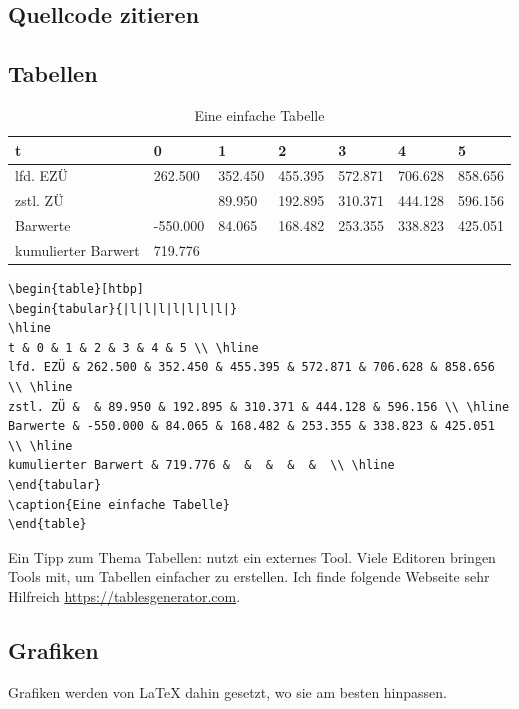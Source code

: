 \subsection{Quellcode zitieren}

\subsection{Tabellen}
\begin{table}[htbp]
\begin{tabular}{|l|l|l|l|l|l|l|}
\hline
t & 0 & 1 & 2 & 3 & 4 & 5 \\ \hline
lfd. EZÜ & 262.500 & 352.450 & 455.395 & 572.871 & 706.628 & 858.656 \\ \hline
zstl. ZÜ &  & 89.950 & 192.895 & 310.371 & 444.128 & 596.156 \\ \hline
Barwerte & -550.000 & 84.065 & 168.482 & 253.355 & 338.823 & 425.051 \\ \hline
kumulierter Barwert & 719.776 &  &  &  &  &  \\ \hline
\end{tabular}
\caption{Eine einfache Tabelle}
\end{table}

\begin{lstlisting}
\begin{table}[htbp]
\begin{tabular}{|l|l|l|l|l|l|l|}
\hline
t & 0 & 1 & 2 & 3 & 4 & 5 \\ \hline
lfd. EZÜ & 262.500 & 352.450 & 455.395 & 572.871 & 706.628 & 858.656 \\ \hline
zstl. ZÜ &  & 89.950 & 192.895 & 310.371 & 444.128 & 596.156 \\ \hline
Barwerte & -550.000 & 84.065 & 168.482 & 253.355 & 338.823 & 425.051 \\ \hline
kumulierter Barwert & 719.776 &  &  &  &  &  \\ \hline
\end{tabular}
\caption{Eine einfache Tabelle}
\end{table}
\end{lstlisting}

Ein Tipp zum Thema Tabellen: nutzt ein externes Tool. Viele Editoren bringen Tools mit, um Tabellen einfacher zu erstellen. Ich finde folgende Webseite sehr Hilfreich \href{https://tablesgenerator.com}{https://tablesgenerator.com}.

\subsection{Grafiken}
Grafiken werden von LaTeX dahin gesetzt, wo sie am besten hinpassen.

